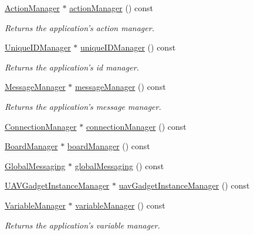 \begin{DoxyCompactItemize}
\hyperlink{class_core_1_1_action_manager}{\-Action\-Manager} $\ast$ \hyperlink{group___core_plugin_gae1378eb075199d7212531112dad29d22}{action\-Manager} () const 
\begin{DoxyCompactList}\small\item\em \-Returns the application's action manager. \end{DoxyCompactList}\item 
\hyperlink{class_core_1_1_unique_i_d_manager}{\-Unique\-I\-D\-Manager} $\ast$ \hyperlink{group___core_plugin_gaab7eddca1a8fee6f0012a73ff3104ac9}{unique\-I\-D\-Manager} () const 
\begin{DoxyCompactList}\small\item\em \-Returns the application's id manager. \end{DoxyCompactList}\item 
\hyperlink{class_core_1_1_message_manager}{\-Message\-Manager} $\ast$ \hyperlink{group___core_plugin_ga0e83f695186bf1d3538da3033a3f39ce}{message\-Manager} () const 
\begin{DoxyCompactList}\small\item\em \-Returns the application's message manager. \end{DoxyCompactList}\item 
\hyperlink{class_core_1_1_connection_manager}{\-Connection\-Manager} $\ast$ \hyperlink{group___core_plugin_ga363477297c4c3033bde34c08df39aadd}{connection\-Manager} () const 
\item 
\hyperlink{class_core_1_1_board_manager}{\-Board\-Manager} $\ast$ \hyperlink{group___core_plugin_ga93b0c02bac385343c0968723fad3504a}{board\-Manager} () const 
\item 
\hyperlink{class_core_1_1_global_messaging}{\-Global\-Messaging} $\ast$ \hyperlink{group___core_plugin_gabb3447bd5a5c494dbbcc3ffd017ddfe5}{global\-Messaging} () const 
\item 
\hyperlink{class_core_1_1_u_a_v_gadget_instance_manager}{\-U\-A\-V\-Gadget\-Instance\-Manager} $\ast$ \hyperlink{group___core_plugin_ga819fa53b14bc8ca57f9354b74bf35284}{uav\-Gadget\-Instance\-Manager} () const 
\item 
\hyperlink{class_core_1_1_variable_manager}{\-Variable\-Manager} $\ast$ \hyperlink{group___core_plugin_ga5c0c3fc105c7bd329fe52f4be0acef22}{variable\-Manager} () const 
\begin{DoxyCompactList}\small\item\em \-Returns the application's variable manager. \end{DoxyCompactList}\item 

\end{DoxyCompactItemize}

